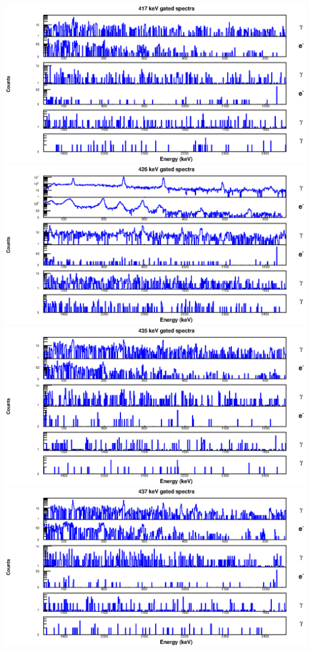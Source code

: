 \begin{landscape}
\includegraphics[scale=1.2]{154Gd_Appendix/417_combined.eps}
\includegraphics[scale=1.2]{154Gd_Appendix/426_combined.eps}
\includegraphics[scale=1.2]{154Gd_Appendix/435_combined.eps}
\includegraphics[scale=1.2]{154Gd_Appendix/437_combined.eps}

\end{landscape}
